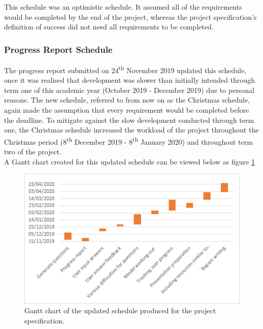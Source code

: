 \documentclass{article}
\begin{document}
This schedule was an optimistic schedule. It assumed all of the requirements would be completed by the end of the project, whereas the project specification's definition of success did not need all requirements to be completed. 

%
%
%

\subsubsection{Progress Report Schedule}

The progress report submitted on 24\textsuperscript{th} November 2019 updated this schedule, once it was realised that development was slower than initially intended through term one of this academic year (October 2019 - December 2019) due to personal reasons. The new schedule, referred to from now on as the Christmas schedule, again made the assumption that every requirement would be completed before the deadline. To mitigate against the slow development conducted through term one, the Christmas schedule increased the workload of the project throughout the Christmas period (8\textsuperscript{th} December 2019 - 8\textsuperscript{th} January 2020) and throughout term two of the project. \\

A Gantt chart created for this updated schedule can be viewed below as figure \ref{figure:progressReportGanttChart}

\begin{figure}[H]
	\centering
	\includegraphics[width=0.9\linewidth]{./data/progressReportGanttChart.png}
	\caption{Gantt chart of the updated schedule produced for the project specification.}
	\label{figure:progressReportGanttChart}
\end{figure}

%
%
%
\end{document}
